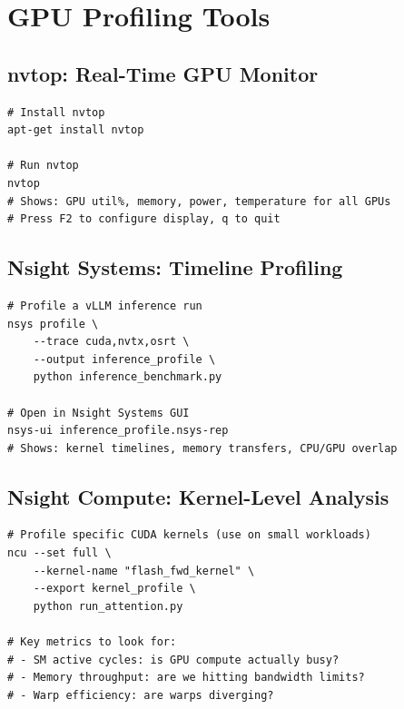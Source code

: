\documentclass[10pt, oneside, openany]{book}
\begin{document}
\section{GPU Profiling Tools}

\subsection{nvtop: Real-Time GPU Monitor}

\begin{lstlisting}[style=bashstyle, caption={Using nvtop for GPU monitoring}]
# Install nvtop
apt-get install nvtop

# Run nvtop
nvtop
# Shows: GPU util%, memory, power, temperature for all GPUs
# Press F2 to configure display, q to quit
\end{lstlisting}

\subsection{Nsight Systems: Timeline Profiling}

\begin{lstlisting}[style=bashstyle, caption={Profiling with Nsight Systems}]
# Profile a vLLM inference run
nsys profile \
    --trace cuda,nvtx,osrt \
    --output inference_profile \
    python inference_benchmark.py

# Open in Nsight Systems GUI
nsys-ui inference_profile.nsys-rep
# Shows: kernel timelines, memory transfers, CPU/GPU overlap
\end{lstlisting}

\subsection{Nsight Compute: Kernel-Level Analysis}

\begin{lstlisting}[style=bashstyle, caption={Per-kernel profiling with ncu}]
# Profile specific CUDA kernels (use on small workloads)
ncu --set full \
    --kernel-name "flash_fwd_kernel" \
    --export kernel_profile \
    python run_attention.py

# Key metrics to look for:
# - SM active cycles: is GPU compute actually busy?
# - Memory throughput: are we hitting bandwidth limits?
# - Warp efficiency: are warps diverging?
\end{lstlisting}
\end{document}
